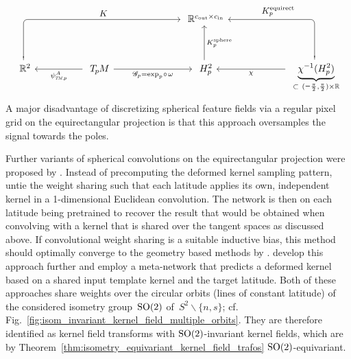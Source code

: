 \begin{equation}
\begin{tikzcd}[column sep=50pt, row sep=36pt, font=\normalsize]
    & &[20pt]
    \R^{\cout\times\cin}
    \\
    \R^2
        \arrow[urr, pos=.75, rounded corners, to path={ 
                -- ([yshift=0pt]\tikztostart.north) 
                |-node[above]{\small$
                        K
                    $} ([xshift=0ex]\tikztotarget.west) 
                }]
    & \TpM
        \arrow[l, "\psiTMp^A"]
        \arrow[r, "\mathscr{G}_p = \exp_p\mkern-2mu\circ\mkern2mu\omega"']
    & H_p^2
        \arrow[u, "K_p^\textup{sphere}\,"']
    &[10pt] \underbrace{\chi^{-1}(H_p^2)}_{\subset\ (\protect\minus\frac{\pi}{2}, \frac{\pi}{2}) \times \R}
        \arrow[l, "\chi"]
        \arrow[ul, pos=.72, rounded corners, to path={ 
                -- ([yshift=0pt]\tikztostart.north) 
                |-node[above]{\small$
                    K^{\textup{equirect}}_p
                    $} ([xshift=0ex]\tikztotarget.east) 
                }]
\end{tikzcd}
\end{equation}
A major disadvantage of discretizing spherical feature fields via a regular pixel grid on the equirectangular projection is that this approach oversamples the signal towards the poles.


Further variants of spherical convolutions on the equirectangular projection were proposed by \citet{su2017spherical,su2019kernel}.
Instead of precomputing the deformed kernel sampling pattern, \citet{su2017spherical} untie the weight sharing such that each latitude applies its own, independent kernel in a 1-dimensional Euclidean convolution.
The network is then on each latitude being pretrained to recover the result that would be obtained when convolving with a kernel that is shared over the tangent spaces as discussed above.
If convolutional weight sharing is a suitable inductive bias, this method should optimally converge to the geometry based methods by \citet{zhao2018distortion,tateno2018distortion}.
\citet{su2019kernel} develop this approach further and employ a meta-network that predicts a deformed kernel based on a shared input template kernel and the target latitude.
Both of these approaches share weights over the circular orbits (lines of constant latitude) of the considered isometry group~$\operatorname{SO}(2)$ of~$S^2 \backslash \{n,s\}$; cf. Fig.~\ref{fig:isom_invariant_kernel_field_multiple_orbits}.
They are therefore identified as kernel field transforms with $\operatorname{SO}(2)$-invariant kernel fields, which are by Theorem~\ref{thm:isometry_equivariant_kernel_field_trafos} $\operatorname{SO}(2)$-equivariant.


